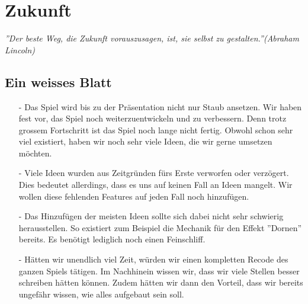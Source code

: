 \chapter{Zukunft}
\textit{''Der beste Weg, die Zukunft vorauszusagen, ist, sie selbst zu gestalten.''(Abraham Lincoln)}

\section{Ein weisses Blatt}
\begin{itemize}
    \item[-] Das Spiel wird bis zu der Präsentation nicht nur Staub ansetzen. Wir haben fest vor, das Spiel noch weiterzuentwickeln und zu verbessern. Denn trotz grossem Fortschritt
    ist das Spiel noch lange nicht fertig. Obwohl schon sehr viel existiert, haben wir noch sehr viele Ideen, die wir gerne umsetzen möchten.
    \item[-] Viele Ideen wurden aus Zeitgründen fürs Erste verworfen oder verzögert. Dies bedeutet allerdings, dass es uns auf keinen Fall an Ideen mangelt. Wir wollen diese
    fehlenden Features auf jeden Fall noch hinzufügen.
    \item[-] Das Hinzufügen der meisten Ideen sollte sich dabei nicht sehr schwierig herausstellen. So existiert zum Beispiel die Mechanik für den Effekt ''Dornen'' bereits. 
    Es benötigt lediglich noch einen Feinschliff. 
    \item[-] Hätten wir unendlich viel Zeit, würden wir einen kompletten Recode des ganzen Spiels tätigen. Im Nachhinein wissen wir, dass wir viele Stellen besser schreiben hätten können. 
    Zudem hätten wir dann den Vorteil, dass wir bereits ungefähr wissen, wie alles aufgebaut sein soll. 
\end{itemize}


